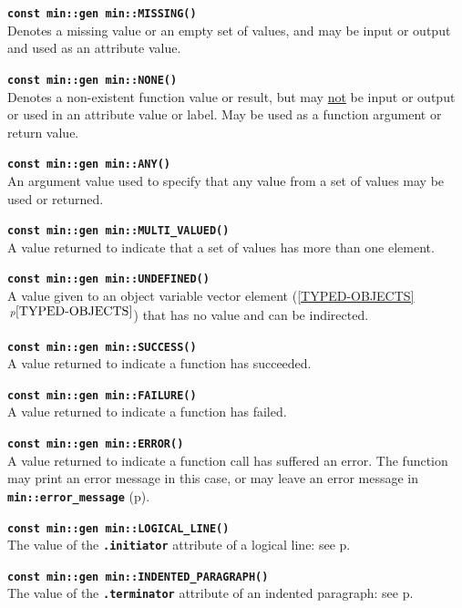 \documentclass[12pt]{article}
\makeatletter
\newcommand{\TT}[1]{{\tt \bfseries #1}}
\newcommand{\ttindex}[1]{\index{#1@{\tt #1}}}
\newcommand{\itemref}[1]{\ref{#1}$\,^{p\pageref{#1}}$}
\newcommand{\pagref}[1]{p\pageref{#1}}
\newcommand{\EOL}{\penalty \exhyphenpenalty}
\newenvironment{indpar}[1][0.3in]%
	{\begin{list}{}%
		     {\setlength{\itemsep}{0in}%
		      \setlength{\topsep}{0in}%
		      \setlength{\parsep}{1ex}%
		      \setlength{\labelwidth}{#1}%
		      \setlength{\leftmargin}{#1}%
		      \addtolength{\leftmargin}{\labelsep}}%
	 \item}%
	{\end{list}}
\newcommand{\LABEL}[1]{\label{#1}}
\newcommand{\MINKEY}[1]%
	   {\TT{#1}\ttindex{min::#1}\ttindex{#1}}
\makeatother
\begin{document}
\begin{indpar}
\begin{list}{}{}
\item[\TT{const min::gen min::}\MINKEY{MISSING()}]~%
	\LABEL{MIN::MISSING}\\
Denotes a missing value or an empty set of values, and may be input
or output and used as an attribute value.
\item[\TT{const min::gen min::}\MINKEY{NONE()}]~%
	\LABEL{MIN::NONE}\\
Denotes a non-existent function value or result, but may \underline{not} be
input or output or used in an attribute value or label.  May be used
as a function argument or return value.
\item[\TT{const min::gen min::}\MINKEY{ANY()}]~%
	\LABEL{MIN::ANY}\\
An argument value used to specify that any value from a set of values may be
used or returned.
\item[\TT{const min::gen min::}\MINKEY{MULTI\_VALUED()}]~%
	\LABEL{MIN::MULTI_VALUED}\\
A value returned to indicate that
a set of values has more than one element.
\item[\TT{const min::gen min::}\MINKEY{UNDEFINED()}]~%
	\LABEL{MIN::UNDEFINED}\\
A value given to an object variable vector element
(\itemref{TYPED-OBJECTS}) that has no value and can be indirected.
\item[\TT{const min::gen min::}\MINKEY{SUCCESS()}]~%
	\LABEL{MIN::SUCCESS}\\
A value returned to indicate a function has succeeded.
\item[\TT{const min::gen min::}\MINKEY{FAILURE()}]~%
	\LABEL{MIN::FAILURE}\\
A value returned to indicate a function has failed.
\item[\TT{const min::gen min::}\MINKEY{ERROR()}]~%
	\LABEL{MIN::ERROR}\\
A value returned to indicate a function call has suffered an error.
The function may print an error message in
this case, or may leave an error message in
\TT{min::\EOL error\_\EOL message} (\pagref{ERROR_MESSAGE}).
\item[\TT{const min::gen min::}\MINKEY{LOGICAL\_LINE()}]~%
	\LABEL{MIN::LOGICAL_LINE}\\
The value of the \TT{.initiator} attribute of a logical line:
see \pagref{LOGICAL-LINE-COMPACT-FORMAT}.
\item[\TT{const min::gen min::}\MINKEY{INDENTED\_PARAGRAPH()}]~%
	\LABEL{MIN::INDENTED_PARAGRAPH}\\
The value of the \TT{.terminator} attribute of an indented paragraph:
see \pagref{INDENTED-PARAGRAPH-COMPACT-FORMAT}.
\end{list}
\end{indpar}
\end{document}
